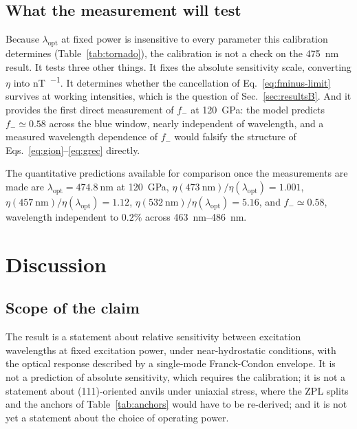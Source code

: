\documentclass[preprint,12pt]{elsarticle}
\newcommand{\fm}{\ensuremath{f_{-}}}
\newcommand{\lopt}{\ensuremath{\lambda_{\mathrm{opt}}}}
\begin{document}
\subsection{What the measurement will test}

Because $\lopt$ at fixed power is insensitive to every parameter this calibration
determines (Table~\ref{tab:tornado}), the calibration is not a check on the
\SI{475}{\nano\meter} result. It tests three other things. It fixes the absolute
sensitivity scale, converting $\eta$ into
\si{\nano\tesla\per\sqrt{\hertz}}. It determines whether the cancellation of
Eq.~\eqref{eq:fminus-limit} survives at working intensities, which is the
question of Sec.~\ref{sec:resultsB}. And it provides the first direct measurement
of $\fm$ at \SI{120}{\giga\pascal}: the model predicts $\fm \simeq 0.58$ across
the blue window, nearly independent of wavelength, and a measured wavelength
dependence of $\fm$ would falsify the structure of
Eqs.~\eqref{eq:gion}--\eqref{eq:grec} directly.

The quantitative predictions available for comparison once the measurements are
made are $\lopt = \SI{474.8}{\nano\meter}$ at \SI{120}{\giga\pascal},
$\eta(\SI{473}{\nano\meter})/\eta(\lopt) = 1.001$,
$\eta(\SI{457}{\nano\meter})/\eta(\lopt) = 1.12$,
$\eta(\SI{532}{\nano\meter})/\eta(\lopt) = 5.16$, and $\fm \simeq 0.58$,
wavelength independent to $0.2\%$ across \SIrange{463}{486}{\nano\meter}.

\section{Discussion}
\label{sec:discussion}

\subsection{Scope of the claim}

The result is a statement about relative sensitivity between excitation
wavelengths at fixed excitation power, under near-hydrostatic conditions, with
the optical response described by a single-mode Franck-Condon envelope. It is not
a prediction of absolute sensitivity, which requires the calibration; it is not a
statement about (111)-oriented anvils under uniaxial stress, where the ZPL splits
and the anchors of Table~\ref{tab:anchors} would have to be re-derived; and it is
not yet a statement about the choice of operating power.
\end{document}
